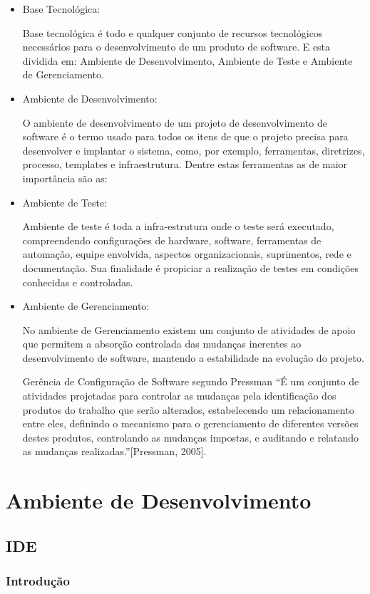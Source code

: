 \documentclass[12pt,a4paper]{article}
\begin{document}
	\begin{itemize}
	\item Base Tecnológica: 
	
	Base tecnológica é todo e qualquer conjunto de recursos tecnológicos necessários para o desenvolvimento de um produto de software. E esta dividida em: Ambiente de Desenvolvimento, Ambiente de Teste e Ambiente de Gerenciamento.
	\item Ambiente de Desenvolvimento:
	
	 O ambiente de desenvolvimento de um projeto de desenvolvimento de software é o termo usado para todos os itens de que o projeto precisa para desenvolver e implantar o sistema, como, por exemplo, ferramentas, diretrizes, processo, templates e infraestrutura. Dentre estas ferramentas as de maior importância são as:
	\item Ambiente de Teste: 
	
	Ambiente de teste é toda a infra-estrutura onde o teste será executado, compreendendo configurações de hardware, software, ferramentas de automação, equipe envolvida, aspectos organizacionais, suprimentos, rede e documentação. Sua finalidade é propiciar a realização de testes em condições conhecidas e controladas.
	\item Ambiente de Gerenciamento:
	
	 No ambiente de Gerenciamento existem um conjunto de atividades de apoio que permitem a absorção controlada das mudanças inerentes ao desenvolvimento de software, mantendo a estabilidade na evolução do projeto.
	
	Gerência de Configuração de Software segundo Pressman “É um conjunto de atividades projetadas para controlar as mudanças pela identificação dos produtos do trabalho que serão alterados, estabelecendo um relacionamento entre eles, definindo o mecanismo para o gerenciamento de diferentes versões destes produtos, controlando as mudanças impostas, e auditando e relatando as mudanças realizadas.”[Pressman, 2005].
	\end{itemize}
	

\clearpage
\section{Ambiente de Desenvolvimento}
	\subsection{IDE}
		\subsubsection{Introdução}
\end{document}
